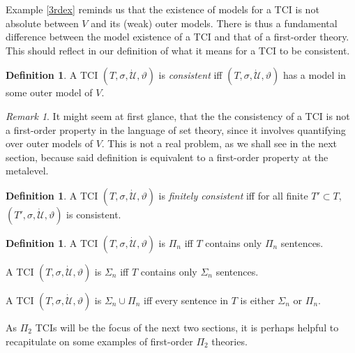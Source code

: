 \documentclass[12pt, twoside]{memoir}
\numberwithin{equation}{section}
\theoremstyle{definition}
\newtheorem{defi}[thm]{Definition}
\theoremstyle{remark}
\newtheorem{rem}[thm]{Remark}
\theoremstyle{definition}
\theoremstyle{definition}
\theoremstyle{definition}
\theoremstyle{remark}
\begin{document}
Example \ref{3rdex} reminds us that the existence of models for a TCI is not absolute between $V$ and its (weak) outer models. There is thus a fundamental difference between the model existence of a TCI and that of a first-order theory. This should reflect in our definition of what it means for a TCI to be consistent.

\begin{defi}\label{TCIcon}
A TCI $(T, \sigma, \dot{\mathcal{U}}, \vartheta)$ is \emph{consistent} iff $(T, \sigma, \dot{\mathcal{U}}, \vartheta)$ has a model in some outer model of $V$. 
\end{defi}

\begin{rem}\label{promise}
It might seem at first glance, that the the consistency of a TCI is not a first-order property in the language of set theory, since it involves quantifying over outer models of $V$. This is not a real problem, as we shall see in the next section, because said definition is equivalent to a first-order property at the metalevel.
\end{rem}

\begin{defi}
A TCI $(T, \sigma, \dot{\mathcal{U}}, \vartheta)$ is \emph{finitely consistent} iff for all finite $T' \subset T$, $(T', \sigma, \dot{\mathcal{U}}, \vartheta)$ is consistent. 
\end{defi}

\begin{defi}
A TCI $(T, \sigma, \dot{\mathcal{U}}, \vartheta)$ is $\Pi_n$ iff $T$ contains only $\Pi_n$ sentences.

A TCI $(T, \sigma, \dot{\mathcal{U}}, \vartheta)$ is $\Sigma_n$ iff $T$ contains only $\Sigma_n$ sentences.

A TCI $(T, \sigma, \dot{\mathcal{U}}, \vartheta)$ is $\Sigma_n \cup \Pi_n$ iff every sentence in $T$ is either $\Sigma_n$ or $\Pi_n$.
\end{defi}

As $\Pi_2$ TCIs will be the focus of the next two sections, it is perhaps helpful to recapitulate on some examples of first-order $\Pi_2$ theories.
\end{document}
